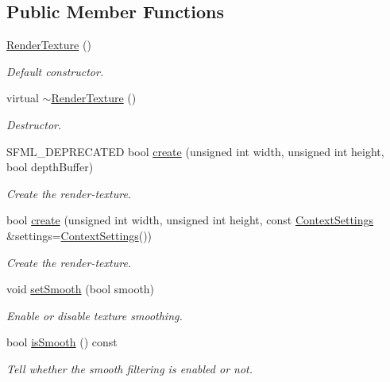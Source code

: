 \subsection*{Public Member Functions}
\begin{DoxyCompactItemize}
\item 
\mbox{\hyperlink{classsf_1_1_render_texture_a19ee6e5b4c40ad251803389b3953a9c6}{Render\+Texture}} ()
\begin{DoxyCompactList}\small\item\em Default constructor. \end{DoxyCompactList}\item 
virtual \mbox{\hyperlink{classsf_1_1_render_texture_a94b84ab9335be84d2a014c964d973304}{$\sim$\+Render\+Texture}} ()
\begin{DoxyCompactList}\small\item\em Destructor. \end{DoxyCompactList}\item 
S\+F\+M\+L\+\_\+\+D\+E\+P\+R\+E\+C\+A\+T\+ED bool \mbox{\hyperlink{classsf_1_1_render_texture_aaec1fb8ee77844da50b0143cb41c8a71}{create}} (unsigned int width, unsigned int height, bool depth\+Buffer)
\begin{DoxyCompactList}\small\item\em Create the render-\/texture. \end{DoxyCompactList}\item 
bool \mbox{\hyperlink{classsf_1_1_render_texture_a49b7b723a80f89bc409a942364351dc3}{create}} (unsigned int width, unsigned int height, const \mbox{\hyperlink{structsf_1_1_context_settings}{Context\+Settings}} \&settings=\mbox{\hyperlink{structsf_1_1_context_settings}{Context\+Settings}}())
\begin{DoxyCompactList}\small\item\em Create the render-\/texture. \end{DoxyCompactList}\item 
void \mbox{\hyperlink{classsf_1_1_render_texture_af08991e63c6020865dd07b20e27305b6}{set\+Smooth}} (bool smooth)
\begin{DoxyCompactList}\small\item\em Enable or disable texture smoothing. \end{DoxyCompactList}\item 
bool \mbox{\hyperlink{classsf_1_1_render_texture_a5b43c007ab6643accc5dae84b5bc8f61}{is\+Smooth}} () const
\begin{DoxyCompactList}\small\item\em Tell whether the smooth filtering is enabled or not. \end{DoxyCompactList}\item 

\end{DoxyCompactItemize}
